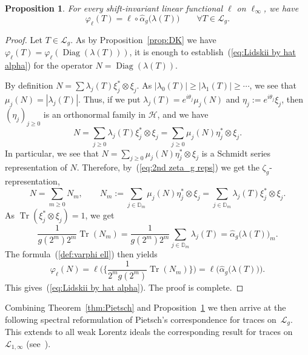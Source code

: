 \documentclass[10pt, a4paper]{amsart}
\newcommand{\D}{\mathbb{D}}
\newcommand{\sL}{\mathscr{L}}
\newcommand{\sH}{\mathscr{H}}
\newcommand{\op}{\operatorname}
\newcommand{\Tr}{\op{Tr}}
\numberwithin{equation}{section}
\newtheorem{proposition}[theorem]{Proposition}
\theoremstyle{definition}
\theoremstyle{remark}
\newcommand{\Diag}{\op{Diag}}
\begin{document}
\begin{proposition}\label{prop:Pietsch.Lidskii}
 For every shift-invariant linear functional $\ell$ on $\ell_\infty$, we have
 \begin{equation}\label{eq:Lidskii by hat alpha}
 \varphi_\ell(T)= \ell\circ \hat{\alpha}_g\big( \lambda(T)\big) \qquad \forall T\in \sL_g.
\end{equation}
\end{proposition}
\begin{proof}
 Let $T\in \sL_g$. As by Proposition~\ref{prop:DK} we have $\varphi_\ell(T)= \varphi_\ell(\Diag( \lambda(T)))$, it is enough to establish~(\ref{eq:Lidskii by hat alpha}) for the operator $N=\Diag( \lambda(T))$.

 By definition $N= \sum \lambda_j(T) \xi_j^*\otimes \xi_j$. As $|\lambda_0(T)|\geq |\lambda_1(T)|\geq \cdots$, we see that $\mu_j(N)=|\lambda_j(T)|$.  Thus, if we put $\lambda_j(T)=e^{i\theta_j}\mu_j(N)$ and $\eta_j:=e^{i\theta_j}\xi_j$, then $(\eta_j)_{j\geq 0}$ is an orthonormal family in $\sH$, and we have
 \begin{equation*}
 N=\sum_{j\geq 0} \lambda_j(T)\xi_j^*\otimes \xi_j= \sum_{j\geq 0} \mu_j(N)\eta_j^*\otimes \xi_j.
\end{equation*}
 In particular, we see that $N=\sum_{j\geq 0} \mu_j(N)\eta_j^*\otimes \xi_j$ is a Schmidt series representation of $N$. Therefore, by~(\ref{eq:2nd zeta_g reps}) we get the $\zeta_g$-representation,
 \begin{equation*}
 N=\sum_{m\geq 0} N_m, \qquad N_m:= \sum_{j\in \D_m} \mu_j(N)\eta_j^*\otimes \xi_j=  \sum_{j\in \D_m} \lambda_j(T)\xi_j^*\otimes \xi_j.
\end{equation*}
 As $\Tr(\xi_j^*\otimes \xi_j)=1$, we get
 \begin{equation*}
 \frac{1}{g(2^m)2^m} \Tr(N_m)=   \frac{1}{g(2^m)2^m} \sum_{j\in \D_m} \lambda_j(T) =\hat{\alpha}_g\big(\lambda(T)\big)_m.
\end{equation*}
 The formula~(\ref{def:varphi ell}) then yields
 \begin{equation*}
 \varphi_\ell(N)= \ell\bigg( \bigg\{\frac{1}{2^{m}g(2^m)} \Tr(N_m)\bigg\}\bigg) =\ell\big(\hat{\alpha}_g\big(\lambda(T)\big)\big).
\end{equation*}
 This gives~(\ref{eq:Lidskii by hat alpha}). The proof is complete.
\end{proof}

Combining Theorem~\ref{thm:Pietsch} and Proposition~\ref{prop:Pietsch.Lidskii} we then arrive at the following spectral reformulation of Pietsch's correspondence for traces on~$\sL_g$. This extends to all weak Lorentz ideals the corresponding result for traces on $\sL_{1,\infty}$ (see~\cite[Theorem~6.3.1(a)--(c)]{LSZ:Book}).
\end{document}
